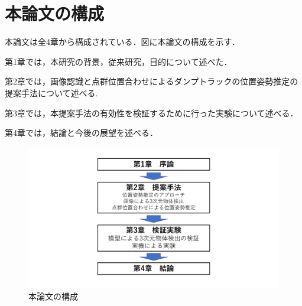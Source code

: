 \section{本論文の構成}
本論文は全4章から構成されている．図に本論文の構成を示す．\par
第1章では，本研究の背景，従来研究，目的について述べた．\par
第2章では，画像認識と点群位置合わせによるダンプトラックの位置姿勢推定の提案手法について述べる.\par
第3章では，本提案手法の有効性を検証するために行った実験について述べる．\par
第4章では，結論と今後の展望を述べる．
\begin{figure}[b]
    \begin{center}
    \includegraphics[width=0.3 \columnwidth]{./chap1/fig/struct.jpg}
    \caption{本論文の構成}
    \label{fig:flow}
    \end{center}
   \end{figure}


